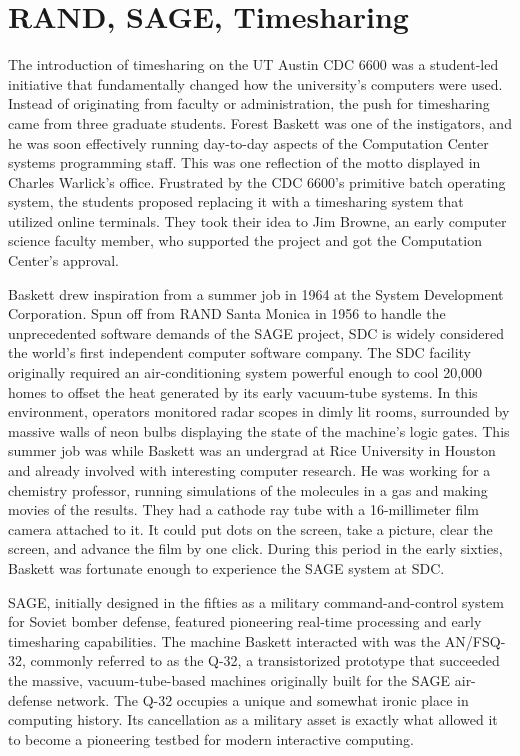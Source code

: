 \section{RAND, SAGE, Timesharing}

The introduction of timesharing on the UT Austin CDC 6600 was a student-led initiative that fundamentally changed how the university's computers were used. Instead of originating from faculty or administration, the push for timesharing came from three graduate students. Forest Baskett was one of the instigators, and he was soon effectively running day-to-day aspects of the Computation Center systems programming staff. This was one reflection of the motto displayed in Charles Warlick’s office. Frustrated by the CDC 6600's primitive batch operating system, the students proposed replacing it with a timesharing system that utilized online terminals. They took their idea to Jim Browne, an early computer science faculty member, who supported the project and got the Computation Center's approval. 

Baskett drew inspiration from a summer job in 1964 at the System Development Corporation. Spun off from RAND Santa Monica in 1956 to handle the unprecedented software demands of the SAGE project, SDC is widely considered the world's first independent computer software company. The SDC facility originally required an air-conditioning system powerful enough to cool 20,000 homes to offset the heat generated by its early vacuum-tube systems. In this environment, operators monitored radar scopes in dimly lit rooms, surrounded by massive walls of neon bulbs displaying the state of the machine's logic gates. This summer job was while Baskett was an undergrad at Rice University in Houston and already involved with interesting computer research. He was working for a chemistry professor, running simulations of the molecules in a gas and making movies of the results. They had a cathode ray tube with a 16-millimeter film camera attached to it. It could put dots on the screen, take a picture, clear the screen, and advance the film by one click. During this period in the early sixties, Baskett was fortunate enough to experience the SAGE system at SDC.

SAGE, initially designed in the fifties as a military command-and-control system for Soviet bomber defense, featured pioneering real-time processing and early timesharing capabilities. The machine Baskett interacted with was the AN/FSQ-32, commonly referred to as the Q-32, a transistorized prototype that succeeded the massive, vacuum-tube-based machines originally built for the SAGE air-defense network. The Q-32 occupies a unique and somewhat ironic place in computing history. Its cancellation as a military asset is exactly what allowed it to become a pioneering testbed for modern interactive computing.

